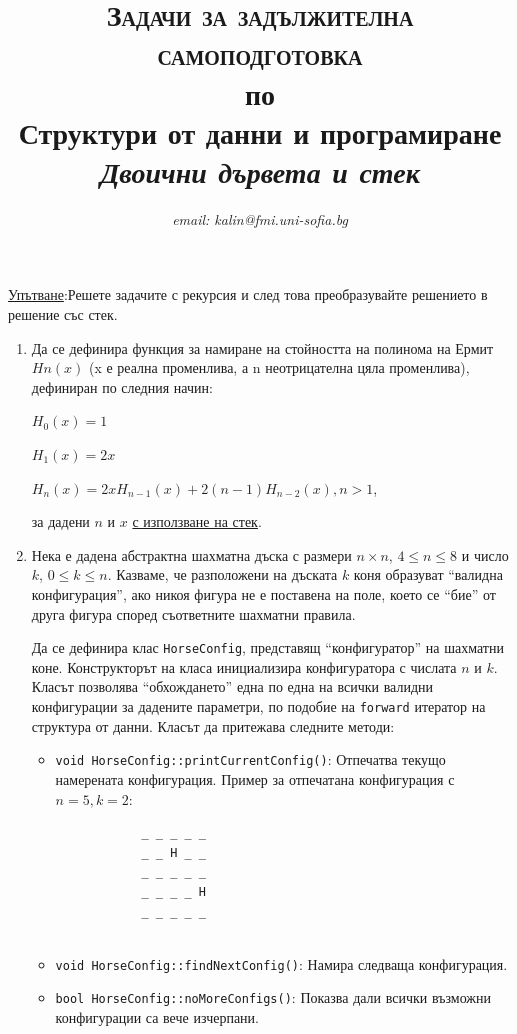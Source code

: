 \documentclass[12pt,a4paper]{article}
\author{\textit{email: kalin@fmi.uni-sofia.bg}}
\title{\textsc{Задачи за задължителна самоподготовка} \\
по \\
Структури от данни и програмиране\\
\textit{Двоични дървета и стек}}
\begin{document}
\maketitle

 \underline{Упътване}:Решете задачите с рекурсия и след това преобразувайте решението в решение със стек.



\begin{enumerate}

	\item Да се дефинира функция за намиране на стойността на полинома на Ермит $Hn(x)$ (x е реална променлива, а n неотрицателна цяла променлива), дефиниран по следния начин:

	$H_0(x)=1$

	$H_1(x)=2x$

	$H_n(x)=2xH_{n-1}(x)+2(n-1)H_{n-2}(x), n>1$,

	за дадени $n$ и $x$ \underline{с използване на стек}.


	\item Нека е дадена абстрактна шахматна дъска с размери $n \times n$, $4 \le n \le 8$ и число $k$, $0 \le k \le n$. Казваме, че разположени на дъската  $k$ коня образуват ``валидна конфигурация'', ако никоя фигура не е поставена на поле, което се ``бие'' от друга фигура според съответните шахматни правила. 

	Да се дефинира клас \texttt{HorseConfig}, представящ ``конфигуратор'' на шахматни коне. Конструкторът на класа инициализира конфигуратора с числата $n$ и $k$. Класът позволява ``обхождането'' една по една на всички валидни конфигурации за дадените параметри, по подобие на \texttt{forward} итератор на структура от данни. Класът да притежава следните методи:

	\begin{itemize}
		\item \texttt{void HorseConfig::printCurrentConfig()}: Отпечатва текущо намерената конфигурация.
			Пример за отпечатана конфигурация с $n=5, k=2$:
			\begin{verbatim}
			_ _ _ _ _
			_ _ H _ _
			_ _ _ _ _
			_ _ _ _ H
			_ _ _ _ _
				
			\end{verbatim}		
		\item \texttt{void HorseConfig::findNextConfig()}: Намира следваща конфигурация.
		\item \texttt{bool HorseConfig::noMoreConfigs()}: Показва дали всички възможни конфигурации са вече изчерпани.
	\end{itemize}



\end{enumerate}
\end{document}
